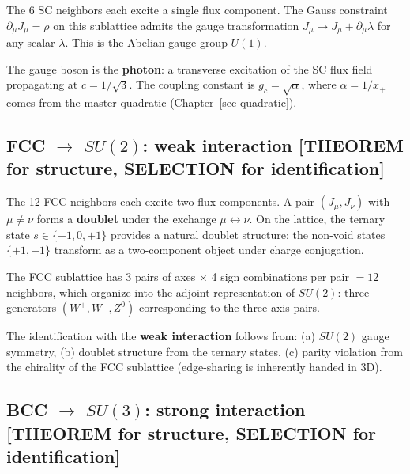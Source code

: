 \documentclass[
  11pt,
  letterpaper,
  twoside,
  openright]{book}
\begin{document}
The 6 SC neighbors each excite a single flux component. The Gauss
constraint \(\partial_\mu J_\mu = \rho\) on this sublattice admits the
gauge transformation \(J_\mu \to J_\mu + \partial_\mu \lambda\) for any
scalar \(\lambda\). This is the Abelian gauge group \(U(1)\).

The gauge boson is the \textbf{photon}: a transverse excitation of the
SC flux field propagating at \(c = 1/\sqrt{3}\). The coupling constant
is \(g_c = \sqrt{\alpha}\), where \(\alpha = 1/x_+\) comes from the
master quadratic (Chapter~\ref{sec-quadratic}).

\subsection{\texorpdfstring{FCC \(\to\) \(SU(2)\): weak interaction
{[}THEOREM for structure, SELECTION for
identification{]}}{FCC \textbackslash to SU(2): weak interaction {[}THEOREM for structure, SELECTION for identification{]}}}\label{fcc-to-su2-weak-interaction-theorem-for-structure-selection-for-identification}

The 12 FCC neighbors each excite two flux components. A pair
\((J_\mu, J_\nu)\) with \(\mu \neq \nu\) forms a \textbf{doublet} under
the exchange \(\mu \leftrightarrow \nu\). On the lattice, the ternary
state \(s \in \{-1, 0, +1\}\) provides a natural doublet structure: the
non-void states \(\{+1, -1\}\) transform as a two-component object under
charge conjugation.

The FCC sublattice has 3 pairs of axes \(\times\) 4 sign combinations
per pair \(= 12\) neighbors, which organize into the adjoint
representation of \(SU(2)\): three generators \((W^+, W^-, Z^0)\)
corresponding to the three axis-pairs.

The identification with the \textbf{weak interaction} follows from: (a)
\(SU(2)\) gauge symmetry, (b) doublet structure from the ternary states,
(c) parity violation from the chirality of the FCC sublattice
(edge-sharing is inherently handed in 3D).

\subsection{\texorpdfstring{BCC \(\to\) \(SU(3)\): strong interaction
{[}THEOREM for structure, SELECTION for
identification{]}}{BCC \textbackslash to SU(3): strong interaction {[}THEOREM for structure, SELECTION for identification{]}}}\label{bcc-to-su3-strong-interaction-theorem-for-structure-selection-for-identification}
\end{document}
